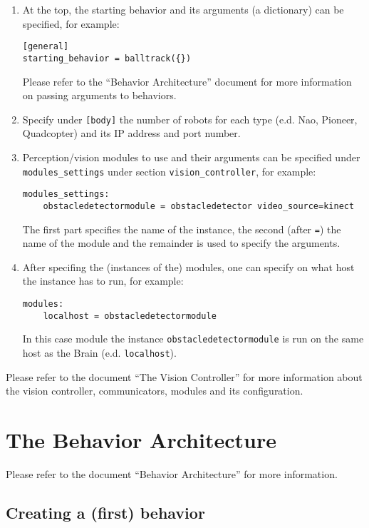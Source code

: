 \documentclass[a4paper, 10pt]{article}
\begin{document}
\begin{enumerate}
    \item At the top, the starting behavior and its arguments (a dictionary) can be specified, for example:
\begin{lstlisting}
[general]
starting_behavior = balltrack({})
\end{lstlisting}
        Please refer to the ``Behavior Architecture'' document for more information on passing arguments to behaviors.
    \item Specify under \lstinline{[body]} the number of robots for each type (e.d. Nao, Pioneer, Quadcopter) and its IP address and port number.
    \item Perception/vision modules to use and their arguments can be specified under \lstinline{modules_settings} under section \lstinline{vision_controller}, for example: 
\begin{lstlisting}
modules_settings:
    obstacledetectormodule = obstacledetector video_source=kinect
\end{lstlisting}
        The first part specifies the name of the instance, the second (after \lstinline{=}) the name of the module and the remainder is used to specify the arguments.
    \item After specifing the (instances of the) modules, one can specify on what host the instance has to run, for example:
\begin{lstlisting}
modules:
    localhost = obstacledetectormodule
\end{lstlisting}
        In this case module the instance \lstinline{obstacledetectormodule} is run on the same host as the Brain (e.d. \lstinline{localhost}).
\end{enumerate}

Please refer to the document ``The Vision Controller'' for more information about the vision controller, communicators, modules and its configuration.

\section{The Behavior Architecture}

Please refer to the document ``Behavior Architecture'' for more information.

\subsection{Creating a (first) behavior}
\end{document}

